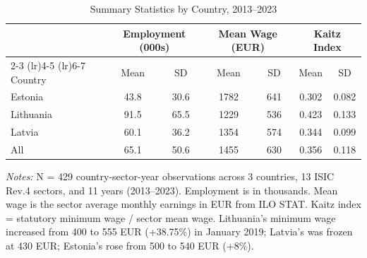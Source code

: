 \begin{table}[H]
\centering
\caption{Summary Statistics by Country, 2013--2023}
\label{tab:summary}
\begin{threeparttable}
\begin{tabular}{lcccccc}
\toprule
& \multicolumn{2}{c}{Employment (000s)} & \multicolumn{2}{c}{Mean Wage (EUR)} & \multicolumn{2}{c}{Kaitz Index} \\
\cmidrule(lr){2-3} \cmidrule(lr){4-5} \cmidrule(lr){6-7}
Country & Mean & SD & Mean & SD & Mean & SD \\
\midrule
Estonia & 43.8 & 30.6 & 1782 & 641 & 0.302 & 0.082 \\
\midrule
Lithuania & 91.5 & 65.5 & 1229 & 536 & 0.423 & 0.133 \\
\midrule
Latvia & 60.1 & 36.2 & 1354 & 574 & 0.344 & 0.099 \\
\midrule
All & 65.1 & 50.6 & 1455 & 630 & 0.356 & 0.118 \\
\bottomrule
\end{tabular}
\begin{tablenotes}[flushleft]
\small
\item \textit{Notes:} N = 429 country-sector-year observations across 3 countries, 13 ISIC Rev.4 sectors, and 11 years (2013--2023). Employment is in thousands. Mean wage is the sector average monthly earnings in EUR from ILO STAT. Kaitz index = statutory minimum wage / sector mean wage. Lithuania's minimum wage increased from 400 to 555 EUR (+38.75\%) in January 2019; Latvia's was frozen at 430 EUR; Estonia's rose from 500 to 540 EUR (+8\%).
\end{tablenotes}
\end{threeparttable}
\end{table}
